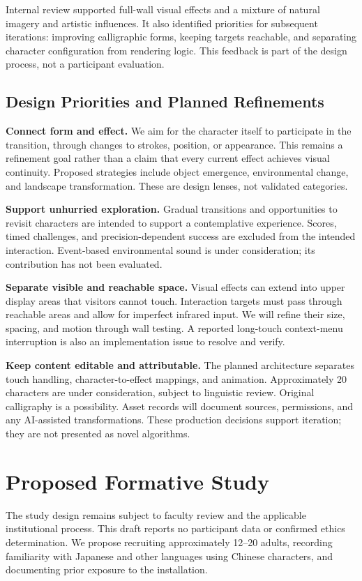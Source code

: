 \documentclass[manuscript,review,anonymous]{acmart}
\begin{document}
Internal review supported full-wall visual effects and a mixture of natural imagery and artistic influences. It also identified priorities for subsequent iterations: improving calligraphic forms, keeping targets reachable, and separating character configuration from rendering logic. This feedback is part of the design process, not a participant evaluation.

\subsection{Design Priorities and Planned Refinements}
\textbf{Connect form and effect.} We aim for the character itself to participate in the transition, through changes to strokes, position, or appearance. This remains a refinement goal rather than a claim that every current effect achieves visual continuity. Proposed strategies include object emergence, environmental change, and landscape transformation. These are design lenses, not validated categories.

\textbf{Support unhurried exploration.} Gradual transitions and opportunities to revisit characters are intended to support a contemplative experience. Scores, timed challenges, and precision-dependent success are excluded from the intended interaction. Event-based environmental sound is under consideration; its contribution has not been evaluated.

\textbf{Separate visible and reachable space.} Visual effects can extend into upper display areas that visitors cannot touch. Interaction targets must pass through reachable areas and allow for imperfect infrared input. We will refine their size, spacing, and motion through wall testing. A reported long-touch context-menu interruption is also an implementation issue to resolve and verify.

\textbf{Keep content editable and attributable.} The planned architecture separates touch handling, character-to-effect mappings, and animation. Approximately 20 characters are under consideration, subject to linguistic review. Original calligraphy is a possibility. Asset records will document sources, permissions, and any AI-assisted transformations. These production decisions support iteration; they are not presented as novel algorithms.

\section{Proposed Formative Study}
The study design remains subject to faculty review and the applicable institutional process. This draft reports no participant data or confirmed ethics determination. We propose recruiting approximately 12--20 adults, recording familiarity with Japanese and other languages using Chinese characters, and documenting prior exposure to the installation.
\end{document}
